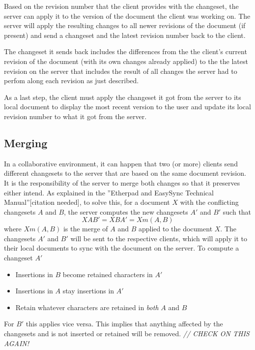 Based on the revision number that the client provides with the changeset, the server can apply it to the version of the document the client was working on. The server will apply the resulting changes to all newer revisions of the document (if present) and send a changeset and the latest revision number back to the client.

The changeset it sends back includes the differences from the the client's current revision of the document (with its own changes already applied) to the the latest revision on the server that includes the result of all changes the server had to perfom along each revision as just described.

As a last step, the client must apply the changeset it got from the server to its local document to display the most recent version to the user and update its local revision number to what it got from the server.

\subsection{Merging}

In a collaborative environment, it can happen that two (or more) clients send different changesets to the server that are based on the same document revision. It is the responsibility of the server to merge both changes so that it preserves either intend. As explained in the ''Etherpad and EasySync Technical Manual''[citation needed], to solve this, for a document $X$ with the conflicting changesets $A$ and $B$, the server computes the new changesets $A'$ and $B'$ such that
$$XAB' = XBA' = Xm(A,B)$$
where $Xm(A,B)$ is the merge of $A$ and $B$ applied to the document $X$. The changesets $A'$ and $B'$ will be sent to the respective clients, which will apply it to their local documents to sync with the document on the server. To compute a changeset $A'$

\begin{itemize}
\item Insertions in $B$ become retained characters in $A'$
\item Insertions in $A$ stay insertions in $A'$
\item Retain whatever characters are retained in \emph{both} $A$ and $B$
\end{itemize}

For $B'$ this applies vice versa. This implies that anything affected by the changesets and is not inserted or retained will be removed. \textit{// CHECK ON THIS AGAIN!}

